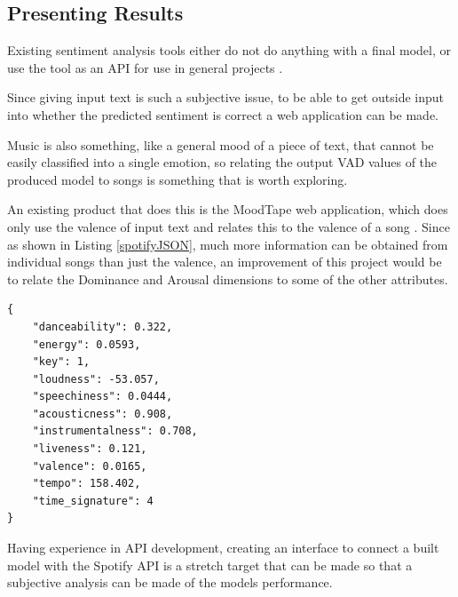 \subsection{Presenting Results}

Existing sentiment analysis tools either do not do anything with a final model, or use the tool as an API for use in general projects \cite{sentimentAPI}.  

Since giving input text is such a subjective issue, to be able to get outside input into whether the predicted sentiment is correct a web application can be made. 

Music is also something, like a general mood of a piece of text, that cannot be easily classified into a single emotion, so relating the output VAD values of the produced model to songs is something that is worth exploring.

An existing product that does this is the MoodTape web application, which does only use the valence of input text and relates this to the valence of a song  \cite{moodtape}. Since as shown in Listing \ref{spotifyJSON}, much more information can be obtained from individual songs than just the valence, an improvement of this project would be to relate the Dominance and Arousal dimensions to some of the other attributes.

\begin{lstlisting}[style=leftCode, caption={Some of the attributes of a song obtained through requesting information through the Spotify API},captionpos=b, label={spotifyJSON}]
{
    "danceability": 0.322,
    "energy": 0.0593,
    "key": 1,
    "loudness": -53.057,
    "speechiness": 0.0444,
    "acousticness": 0.908,
    "instrumentalness": 0.708,
    "liveness": 0.121,
    "valence": 0.0165,
    "tempo": 158.402,
    "time_signature": 4
}
\end{lstlisting}

Having experience in API development, creating an interface to connect a built model with the Spotify API is a stretch target that can be made so that a subjective analysis can be made of the models performance. 